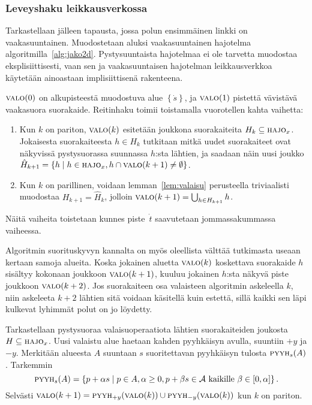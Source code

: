 \documentclass[finnish]{tktltiki2}
\theoremstyle{definition}
\theoremstyle{remark}
\newcommand\crange[2]{\ensuremath{\left [ #1 , #2 \right ]}\xspace}
\newcommand\set[1]{\ensuremath{\left\{#1\right\}}\xspace}
\newcommand\spt{\ensuremath{\dot{s}}\xspace}
\newcommand\ept{\ensuremath{\dot{t}}\xspace}
\newcommand\fspace{\ensuremath{\mathcal{A}}\xspace}
\newcommand\reach[1]{\ensuremath{\textsc{valo}(#1)}\xspace}
\newcommand\decomp[1]{\ensuremath{\textsc{hajo}_{#1}}\xspace}
\newcommand\sweep[2]{\ensuremath{\textsc{pyyh}_{#2}{(#1)}}\xspace}
\begin{document}
\subsubsection{Leveyshaku leikkausverkossa}

Tarkastellaan jälleen tapausta, jossa polun ensimmäinen linkki on vaakasuuntainen.
Muodostetaan aluksi vaakasuuntainen hajotelma algoritmilla~\ref{alg:jako2d}.
Pystysuuntaista hajotelmaa ei ole tarvetta muodostaa eksplisiittisesti, vaan sen ja vaakasuuntaisen hajotelman leikkausverkkoa käytetään ainoastaan implisiittisenä rakenteena.

\reach{0} on alkupisteestä muodostuva alue $\set{\spt}$, ja \reach{1} pistettä vävistävä vaakasuora suorakaide.
Reitinhaku toimii toistamalla vuorotellen kahta vaihetta:

\begin{enumerate}
\item Kun $k$ on pariton, \reach{k} esitetään joukkona suorakaiteita $H_k\subseteq\decomp{x}$. Jokaisesta suorakaiteesta $h\in H_k$ tutkitaan mitkä uudet suorakaiteet ovat näkyvissä pystysuorassa suunnassa $h$:sta lähtien, ja saadaan näin uusi joukko $\hat{H}_{k+1}=\set{h \mid h\in\decomp{x}, h\cap\reach{k+1}\neq\emptyset}$.
\item Kun $k$ on parillinen, voidaan lemman~\ref{lem:valaisu} perusteella triviaalisti muodostaa $H_{k+1}=\hat{H}_k$, jolloin $\reach{k+1}=\bigcup_{h\in H_{k+1}}h$.
\end{enumerate}

Näitä vaiheita toistetaan kunnes piste~\ept saavutetaan jommassakummassa vaiheessa.

Algoritmin suorituskyvyn kannalta on myös oleellista välttää tutkimasta useaan kertaan samoja alueita.
Koska jokainen aluetta \reach{k} koskettava suorakaide $h$ sisältyy kokonaan joukkoon \reach{k+1}, kuuluu jokainen $h$:sta näkyvä piste joukkoon \reach{k+2}.
Jos suorakaiteen osa valaisteen algoritmin askeleella $k$, niin askeleeta $k+2$ lähtien sitä voidaan käsitellä kuin estettä, sillä kaikki sen läpi kulkevat lyhimmät polut on jo löydetty.

Tarkastellaan pystysuoraa valaisuoperaatiota lähtien suorakaiteiden joukosta $H\subseteq\decomp{x}$.
Uusi valaistu alue haetaan kahden pyyhkäisyn avulla, suuntiin $+y$ ja $-y$.
Merkitään alueesta $A$ suuntaan $s$ suoritettavan pyyhkäisyn tulosta \sweep{A}{s}.
Tarkemmin
$$\sweep{A}{s}=\set{p+\alpha s \mid p\in A, \alpha\ge 0, p+\beta s\in\fspace \text{ kaikille } \beta\in\crange{0}{\alpha}}.$$
Selvästi $\reach{k+1}=\sweep{\reach{k}}{+y}\cup\sweep{\reach{k}}{-y}$ kun $k$ on pariton.
\end{document}
